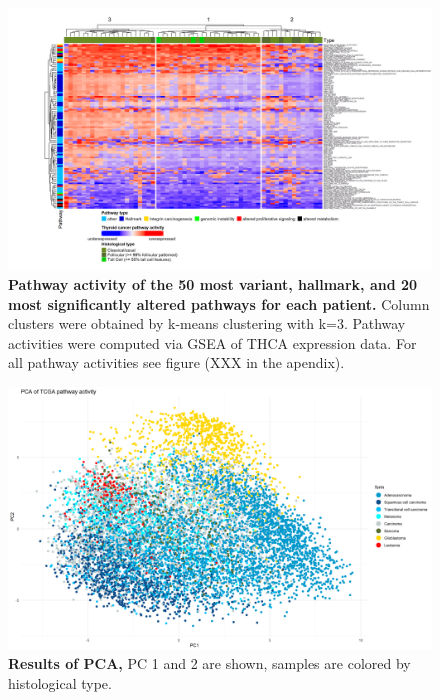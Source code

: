 \documentclass[
  11pt,
  parskip,
  oneside]{scrreprt}
\begin{document}
\begin{figure}

{\centering \includegraphics[width=1\linewidth]{figures/THCA GSEA Heatmap fertig top 50} 

}

\caption{\textbf{Pathway activity of the 50 most variant, hallmark, and 20 most significantly altered pathways for each patient.} Column clusters were obtained by k-means clustering with k=3. Pathway activities were computed via GSEA of THCA expression data. For all pathway activities see figure (XXX in the apendix).}\label{fig:THCAhmGSEA}
\end{figure}

\begin{figure}

{\centering \includegraphics[width=1\linewidth]{figures/Pan Cancer PCA PC1und2 cancer form} 

}

\caption{\textbf{Results of PCA,} PC 1 and 2 are shown, samples are colored by histological type.}\label{fig:PCAcancerform}
\end{figure}
\end{document}
